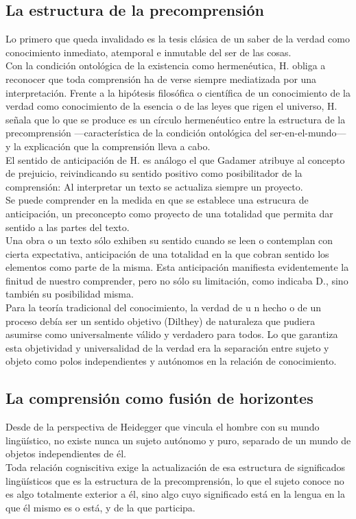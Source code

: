 \documentclass[a4paper, 11pt, twocolumn, spanish]{article}
\begin{document}
\subsection{La estructura de la precomprensión}
\label{sec:orga79d93b}
Lo primero que queda invalidado es la tesis clásica de un saber de la
verdad como conocimiento inmediato, atemporal e inmutable del ser de
las cosas.\\[0pt]
Con la condición ontológica de la existencia como hermenéutica,
H. obliga a reconocer que toda comprensión ha de verse siempre
mediatizada por una interpretación. Frente a la hipótesis filosófica o
científica de un conocimiento de la verdad como conocimiento de la
esencia o de las leyes que rigen el universo, H. señala que lo que se
produce es un círculo hermenéutico entre la estructura de la
precomprensión —característica de la condición ontológica del
ser-en-el-mundo— y la explicación que la comprensión lleva a cabo.\\[0pt]

El sentido de anticipación de H. es análogo el que Gadamer atribuye al
concepto de prejuicio, reivindicando su sentido positivo como
posibilitador de la comprensión: Al interpretar un texto se actualiza
siempre un proyecto.\\[0pt]
Se puede comprender en la medida en que se establece una estrucura de
anticipación, un preconcepto como proyecto de una totalidad que
permita dar sentido a las partes del texto.\\[0pt]
Una obra o un texto sólo exhiben su sentido cuando se leen o
contemplan con cierta expectativa, anticipación de una totalidad en la
que cobran sentido los elementos como parte de la misma. Esta
anticipación manifiesta evidentemente la finitud de nuestro
comprender, pero no sólo su limitación, como indicaba D., sino también
su posibilidad misma.\\[0pt]

Para la teoría tradicional del conocimiento, la verdad de u n hecho o
de un proceso debía ser un sentido objetivo (Dilthey) de naturaleza
que pudiera asumirse como universalmente válido y verdadero para
todos. Lo que garantiza esta objetividad y universalidad de la verdad
era la separación entre sujeto y objeto como polos independientes y
autónomos en la relación de conocimiento.

\subsection{La comprensión como fusión de horizontes}
\label{sec:org18c3469}
Desde de la perspectiva de Heidegger que vincula el hombre con su
mundo lingüístico, no existe nunca un sujeto autónomo y puro, separado
de un mundo de objetos independientes de él.\\[0pt]
Toda relación cogniscitiva exige la actualización de esa estructura de
significados lingüísticos que es la estructura de la precomprensión,
lo que el sujeto conoce no es algo totalmente exterior a él, sino algo
cuyo significado está en la lengua en la que él mismo es o está, y de
la que participa.\\[0pt]
\end{document}
